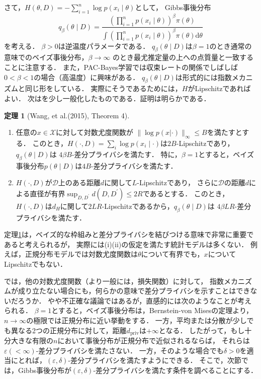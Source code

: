 \documentclass{jarticle}
\newcommand{\dd}{\mathrm{d}}
\theoremstyle{definition}
\newtheorem{thm}{定理}
\begin{document}
さて，$H(\theta, D) = -\sum_{i=1}^{n}\log p(x_i \mid \theta)$として，
Gibbs事後分布
\begin{equation}
q_\beta(\theta \mid D) = 
\frac{ \left( \prod_{i=1}^{n} p(x_i \mid \theta)\right)^\beta \pi(\theta)}
{\int \left( \prod_{i=1}^{n} p(x_i \mid \theta)\right)^\beta \pi(\theta) \dd\theta}
\end{equation}
を考える．
$\beta>0$は逆温度パラメータである．
$q_\beta(\theta \mid D)$は$\beta=1$のとき通常の意味でのベイズ事後分布，$\beta \to \infty$
のとき最尤推定量の上への点質量と一致することに注意する．
また，PAC-Bayes学習では収束レートの関係でしばしば$0<\beta<1$の場合（高温度）に興味がある．
$q_\beta(\theta \mid D)$は形式的には指数メカニズムと同じ形をしている．
実際にそうであるためには，$H$がLipschitzであればよい．
次は\cite{Wang2015b}を少し一般化したものである．証明は明らかである．
\begin{thm}[Wang, et al.(2015)\cite{Wang2015b}, Theorem 4] \label{thm:wang}
\begin{enumerate}
\renewcommand{\labelenumi}{(\roman{enumi})}
\item 任意の$x\in\mathcal{X}$に対して対数尤度関数が
$\parallel \log p(x|\cdot) \parallel_\infty \leq B$を満たすとする．
このとき，$H(\cdot, D)=\sum_{i}\log p(x_i \mid \cdot)$は$2B$-Lipschitzであり，$q_\beta(\theta \mid D)$は
$4\beta B$-差分プライバシを満たす．
特に，$\beta=1$とすると，ベイズ事後分布$p(\theta \mid D)$は$4B$-差分プライバシを満たす．
\item $H(\cdot, D)$が$\mathcal{D}$上のある距離$d$に関して$L$-Lipschitzであり，
さらに$\mathcal{D}$の距離$d$による直径が有界$\sup_{D,D^\prime}d(D,D^\prime)\leq 2R$であるとする．
このとき，$H(\cdot, D)$は$d_H$に関して$2LR$-Lipschitzであるから，$q_\beta(\theta \mid D)$は
$4\beta LR$-差分プライバシを満たす．
\end{enumerate}
\end{thm}
定理\ref{thm:wang}は，ベイズ的な枠組みと差分プライバシを結びつける意味で非常に重要であると考えられるが，
実際には(i)(ii)の仮定を満たす統計モデルは多くない．
例えば，正規分布モデルでは対数尤度関数は$\theta$について有界でも，$x$についてLipschitzでもない．

では，他の対数尤度関数（より一般には，損失関数）に対して，
指数メカニズムが成り立たない場合にも，何らかの意味で差分プライバシを示すことはできないだろうか．
やや不正確な議論ではあるが，直感的には次のようなことが考えられる．
$\beta=1$とすると，ベイズ事後分布は，Bernstein-von Misesの定理\cite{vdV1998}より，
$n\to\infty$の極限では正規分布に近い挙動をする．
一方，平均または分散が少しでも異なる2つの正規分布に対して，距離$d_\mathrm{priv}$は$+\infty$となる．
したがって，もし十分大きな有限の$n$において事後分布が正規分布で近似されるならば，
それらは$\varepsilon (<\infty)$-差分プライバシを満たさない．
一方，そのような場合でも$\delta > 0$を適当にとれば，$(\varepsilon, \delta)$-差分プライバシを満たすようにできる．
そこで，次節では，Gibbs事後分布が$(\varepsilon, \delta)$-差分プライバシを満たす条件を調べることにする．
\end{document}
